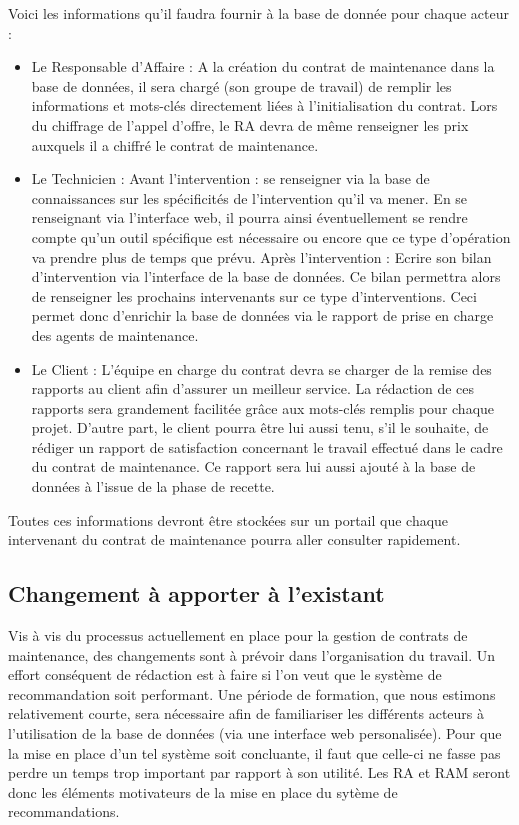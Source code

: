 Voici les informations qu'il faudra fournir à la base de donnée pour chaque acteur : 

\begin{itemize}
\item Le Responsable d'Affaire : A la création du contrat de maintenance dans la base de données, il sera chargé (son groupe de travail) de remplir les informations et mots-clés directement liées à l'initialisation du contrat. Lors du chiffrage de l'appel d'offre, le RA devra de même renseigner les prix auxquels il a chiffré le contrat de maintenance.
\item Le Technicien : Avant l'intervention : se renseigner via la base de connaissances sur les spécificités de l'intervention qu'il va mener. En se renseignant via l'interface web, il pourra ainsi éventuellement se rendre compte qu'un outil spécifique est nécessaire ou encore que ce type d'opération va prendre plus de temps que prévu.
Après l'intervention : Ecrire son bilan d'intervention via l'interface de la base de données. Ce bilan permettra alors de renseigner les prochains intervenants sur ce type d'interventions. Ceci permet donc d'enrichir la base de données via le rapport de prise en charge des agents de maintenance.
\item Le Client : L'équipe en charge du contrat devra se charger de la remise des rapports au client afin d'assurer un meilleur service. La rédaction de ces rapports sera grandement facilitée grâce aux mots-clés remplis pour chaque projet. D'autre part, le client pourra être lui aussi tenu, s'il le souhaite, de rédiger un rapport de satisfaction concernant le travail effectué dans le cadre du contrat de maintenance. Ce rapport sera lui aussi ajouté à la base de données à l'issue de la phase de recette.
\end{itemize}

Toutes ces informations devront être stockées sur un portail que chaque intervenant du contrat de maintenance pourra aller consulter rapidement.

\subsection{Changement à apporter à l'existant}

Vis à vis du processus actuellement en place pour la gestion de contrats de maintenance, des changements sont à prévoir dans l'organisation du travail. Un effort conséquent de rédaction est à faire si l'on veut que le système de recommandation soit performant. Une période de formation, que nous estimons relativement courte, sera nécessaire afin de familiariser les différents acteurs à l'utilisation de la base de données (via une interface web personalisée). Pour que la mise en place d'un tel système soit concluante, il faut que celle-ci ne fasse pas perdre un temps trop important par rapport à son utilité. Les RA et RAM seront donc les éléments motivateurs de la mise en place du sytème de recommandations.

